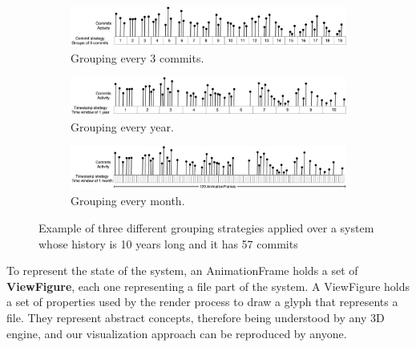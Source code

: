 \begin{figure}
    \begin{center}
        \begin{subfigure}{1\textwidth}
            \includegraphics[width=\linewidth]{TimeWindow1.jpg}
            \caption{Grouping every 3 commits.} 
            \label{fig:TimeWindow1}
        \end{subfigure}
        \begin{subfigure}{1\textwidth}
            \includegraphics[width=\linewidth]{TimeWindow2.jpg}
            \caption{Grouping every year.} 
            \label{fig:TimeWindow2}
        \end{subfigure}
        \begin{subfigure}{1\textwidth}
            \includegraphics[width=\linewidth]{TimeWindow3.jpg}
            \caption{Grouping every month.}
            \label{fig:TimeWindow3}
        \end{subfigure}
        \caption[xample of three different grouping strategies]{Example of three different grouping strategies applied over a system whose history is 10 years long and it has 57 commits}
        \label{fig:TimeWindowExamples}
    \end{center}
\end{figure}



To represent the state of the system, an AnimationFrame holds a set of \textbf{ViewFigure}, each one representing a file part of the system.
\bigbreak
A ViewFigure holds a set of properties used by the render process to draw a glyph that represents a file. They represent abstract concepts, therefore being understood by any 3D engine, and our visualization approach can be reproduced by anyone. 

